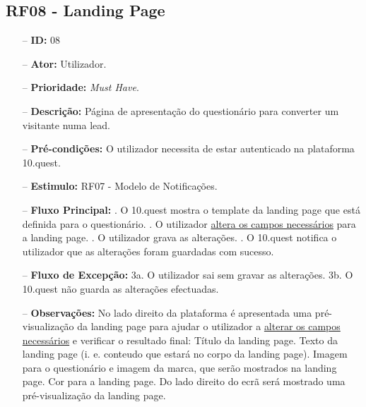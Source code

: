 \subsection{RF08 - Landing Page}
\begin{itemize}
	\item[--] \textbf{ID:} 08
	\item[--]  \textbf{Ator:} Utilizador.
	\item[--]  \textbf{Prioridade:} \textit{Must Have}.
	\item[--]  \textbf{Descrição:} Página de apresentação do questionário para converter um visitante numa lead.
	\item[--]  \textbf{Pré-condições:} O utilizador necessita de estar autenticado na plataforma 10.quest.
	\item[--]  \textbf{Estimulo:} RF07 - Modelo de Notificações.
	\item[--]  \textbf{Fluxo Principal:} 
		. O 10.quest mostra o template da landing page que está definida para o questionário.
		. O utilizador \underline{altera os campos necessários} para a landing page.
		. O utilizador grava as alterações.
		. O 10.quest notifica o utilizador que as alterações foram guardadas com sucesso.
	\item[--]  \textbf{Fluxo de Excepção:} 
		\subitem 3a. O utilizador sai sem gravar as alterações.
		\subitem 3b. O 10.quest não guarda as alterações efectuadas.
	\item[--]  \textbf{Observações:} No lado direito da plataforma é apresentada uma pré-visualização da landing page para ajudar o utilizador a \underline{alterar os campos necessários} e verificar o resultado final:
		\subitem Título da landing page.
		\subitem Texto da landing page (i. e. conteudo que estará no corpo da landing page).
		\subitem Imagem para o questionário e imagem da marca, que serão mostrados na landing page.
		\subitem Cor para a landing page.
	Do lado direito do ecrã será mostrado uma pré-visualização da landing page.
\end{itemize}
\newpage

